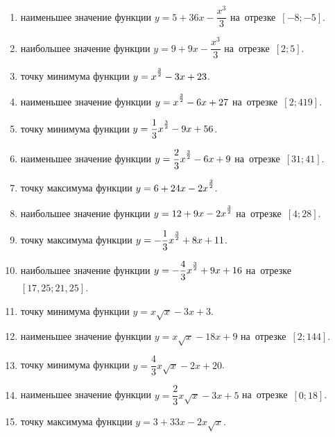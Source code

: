 \documentclass[a4paper,10pt]{article}
\begin{document}
\begin{enumerate}
\item {} наименьшее значение функции $y=5 +36x-\dfrac{x^3}{3}$ на~отрезке~$\left[-8;-5\right]$.

\item {} наибольшее значение функции $y=9 +9x-\dfrac{x^3}{3}$ на~отрезке~$\left[2;5\right]$.

\item {} точку минимума функции $y=x\strut^{\frac{3}{2}} -3x+23$.

\item {} наименьшее значение функции $y=x\strut^{\frac{3}{2}} -6x+27$ на~отрезке~$\left[2;419\right]$.

\item {} точку минимума функции $y=\dfrac{1}{3}x\strut^{\frac{3}{2}} -9x+56$.

\item {} наименьшее значение функции $y=\dfrac{2}{3}x\strut^{\frac{3}{2}} -6x+9$ на~отрезке~$\left[31;41\right]$.

\item {} точку максимума функции $y=6+24x-2x\strut^{\frac{3}{2}}$.

\item {} наибольшее значение функции $y=12+9x-2x\strut^{\frac{3}{2}}$ на~отрезке~$\left[4;28\right]$.

\item {} точку максимума функции $y=-\dfrac{1}{3}x\strut^{\frac{3}{2}} +8x+11$.

\item {} наибольшее значение функции $y=-\dfrac{4}{3}x\strut^{\frac{3}{2}} +9x+16$ на~отрезке~$\left[17,25;21,25\right]$.

\item {} точку минимума функции $y=x\sqrt{x} -3x+3$.

\item {} наименьшее значение функции $y=x\sqrt{x} -18x+9$ на~отрезке~$\left[2;144\right]$.

\item {} точку минимума функции $y=\dfrac{4}{3}x\sqrt{x} -2x+20$.

\item {} наименьшее значение функции $y=\dfrac{2}{3}x\sqrt{x} -3x+5$ на~отрезке~$\left[0;18\right]$.

\item {} точку максимума функции $y=3+33x -2x\sqrt{x}$.


\end{enumerate}
\end{document}
